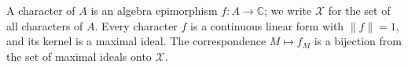 A character of $A$ is an algebra epimorphism $f: A \to \mathbb{C}$; we write $\mathcal{X}$ for the set of all characters of $A$. Every character $f$ is a continuous linear form with $\|f\| = 1$, and its kernel is a maximal ideal. The correspondence $M \mapsto f_M$ is a bijection from the set of maximal ideals onto $\mathcal{X}$.
